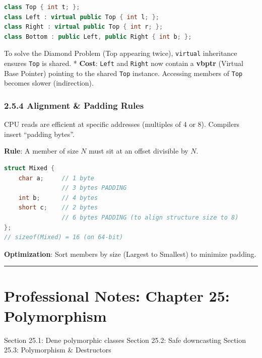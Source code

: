 \begin{lstlisting}[language={C++}]
class Top { int t; };
class Left : virtual public Top { int l; };
class Right : virtual public Top { int r; };
class Bottom : public Left, public Right { int b; };
\end{lstlisting}

To solve the Diamond Problem (Top appearing twice),
\passthrough{\lstinline!virtual!} inheritance ensures
\passthrough{\lstinline!Top!} is shared. * \textbf{Cost}:
\passthrough{\lstinline!Left!} and \passthrough{\lstinline!Right!} now
contain a \textbf{vbptr} (Virtual Base Pointer) pointing to the shared
\passthrough{\lstinline!Top!} instance. Accessing members of
\passthrough{\lstinline!Top!} becomes slower (indirection).

\hypertarget{alignment-padding-rules}{%
\subsubsection{2.5.4 Alignment \& Padding
Rules}\label{alignment-padding-rules}}

CPU reads are efficient at specific addresses (multiples of 4 or 8).
Compilers insert ``padding bytes''.

\textbf{Rule}: A member of size \(N\) must sit at an offset divisible by
\(N\).

\begin{lstlisting}[language={C++}]
struct Mixed {
    char a;     // 1 byte
                // 3 bytes PADDING
    int b;      // 4 bytes
    short c;    // 2 bytes
                // 6 bytes PADDING (to align structure size to 8)
};
// sizeof(Mixed) = 16 (on 64-bit)
\end{lstlisting}

\textbf{Optimization}: Sort members by size (Largest to Smallest) to
minimize padding.

\begin{center}\rule{0.5\linewidth}{0.5pt}\end{center}

\hypertarget{professional-notes-chapter-25-polymorphism}{%
\section{Professional Notes: Chapter 25:
Polymorphism}\label{professional-notes-chapter-25-polymorphism}}

Section 25.1: Dene polymorphic classes Section 25.2: Safe downcasting
Section 25.3: Polymorphism \& Destructors

